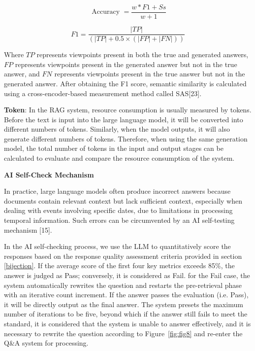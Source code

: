 \begin{equation}
\text { Accuracy }=\frac{w * F 1+S s}{w+1}
\label{8}
\end{equation}

\begin{equation}
F 1=\frac{|T P|}{(|T P|+0.5 \times(|F P|+|F N|))}
\label{9}
\end{equation}

Where $TP$ represents viewpoints present in both the true and generated answers, $FP$ represents viewpoints present in the generated answer but not in the true answer, and $FN$ represents viewpoints present in the true answer but not in the generated answer. After obtaining the F1 score, semantic similarity is calculated using a cross-encoder-based measurement method called SAS[23].

\textbf{Token}: In the RAG system, resource consumption is usually measured by tokens. Before the text is input into the large language model, it will be converted into different numbers of tokens. Similarly, when the model outputs, it will also generate different numbers of tokens. Therefore, when using the same generation model, the total number of tokens in the input and output stages can be calculated to evaluate and compare the resource consumption of the system.



\textbf{AI Self-Check Mechanism}

In practice, large language models often produce incorrect answers because documents contain relevant context but lack sufficient context, especially when dealing with events involving specific dates, due to limitations in processing temporal information. Such errors can be circumvented by an AI self-testing mechanism [15].

In the AI self-checking process, we use the LLM to quantitatively score the responses based on the response quality assessment criteria provided in section \ref{bijection}. If the average score of the first four key metrics exceeds 85\%, the answer is judged as Pass; conversely, it is considered as Fail. for the Fail case, the system automatically rewrites the question and restarts the pre-retrieval phase with an iterative count increment. If the answer passes the evaluation (i.e. Pass), it will be directly output as the final answer. The system presets the maximum number of iterations to be five, beyond which if the answer still fails to meet the standard, it is considered that the system is unable to answer effectively, and it is necessary to rewrite the question according to Figure~\ref{fig:fig8} and re-enter the Q\&A system for processing.

